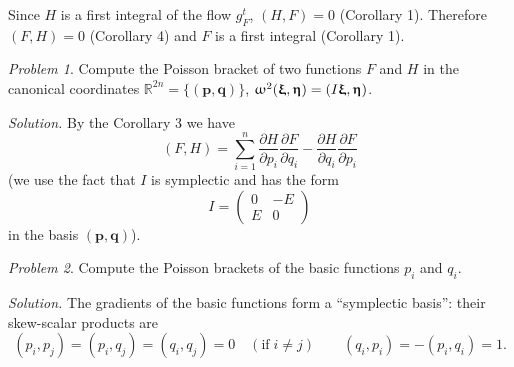 \documentclass[leqno]{book}
\renewcommand{\pmb}[1]{{
  \renewcommand{\alpha}{\upalpha}
  \renewcommand{\beta}{\upbeta}
  \renewcommand{\gamma}{\upgamma}
  \renewcommand{\delta}{\updelta}
  \renewcommand{\epsilon}{\upepsilon}
  \renewcommand{\varepsilon}{\upvarepsilon}
  \renewcommand{\zeta}{\upzeta}
  \renewcommand{\eta}{\upeta}
  \renewcommand{\theta}{\uptheta}
  \renewcommand{\iota}{\upiota}
  \renewcommand{\kappa}{\upkappa}
  \renewcommand{\lambda}{\uplambda}
  \renewcommand{\mu}{\upmu}
  \renewcommand{\nu}{\upnu}
  \renewcommand{\xi}{\upxi}
  \renewcommand{\pi}{\uppi}
  \renewcommand{\rho}{\uprho}
  \renewcommand{\sigma}{\upsigma}
  \renewcommand{\tau}{\uptau}
  \renewcommand{\upsilon}{\upupsilon}
  \renewcommand{\varphi}{\upvarphi}
  \renewcommand{\phi}{\upphi}
  \renewcommand{\chi}{\upchi}
  \renewcommand{\psi}{\uppsi}
  \renewcommand{\omega}{\upomega}
  \boldsymbol{#1}
}}
\numberwithin{equation}{section}
\theoremstyle{plain}
\let\oldendproof\endproof
\renewenvironment{proof}[1][\proofname]{%
  \oldproof[\textsc{#1}]%
}{\oldendproof}
\theoremstyle{definition}
\theoremstyle{remark}
\theoremstyle{smallcap}
\newtheorem{prob}{Problem}
\numberwithin{prob}{section}
\newcommand{\solution}[1]{\textit{Solution.} #1}
\begin{document}
\begin{proof}
  Since $H$ is a first integral of the flow $g_F^t$,
  $(H, F) = 0$ (Corollary 1).
  Therefore $(F, H) = 0$ (Corollary 4)
  and $F$ is a first integral (Corollary 1).

\end{proof}

\begin{prob}
  Compute the Poisson bracket of two functions $F$ and $H$
  in the canonical coordinates
  $\mathbb R^{2n} = \{(\mathbf p, \mathbf q)\}$,
  $\omega^2(\pmb\xi, \pmb\eta) = (I\pmb\xi, \pmb\eta)$.

  \solution{
    By the Corollary 3 we have
    $$
    (F, H) =
    \sum_{i = 1}^n
      \frac{ \partial H } { \partial p_i } \frac{ \partial F } { \partial q_i }
      -
      \frac{ \partial H } { \partial q_i } \frac{ \partial F } { \partial p_i }
    $$
    (we use the fact that $I$ is symplectic and has the form
    $$
    I = \left(\begin{array}{ccc}
        0 & -E \\
        E & 0
    \end{array}\right)
    $$
    in the basis $(\mathbf p, \mathbf q)$).
  }
\end{prob}

\begin{prob}
  Compute the Poisson brackets of the basic functions $p_i$ and $q_i$.

  \solution{
    The gradients of the basic functions form a ``symplectic basis'':
    their skew-scalar products are
    $$
    (p_i, p_j) = (p_i, q_j) = (q_i, q_j) = 0 \quad (\mathrm{if}\; i\ne j)
    \qquad
    (q_i, p_i) = -(p_i, q_i) = 1.
    $$
  }
\end{prob}
\end{document}

